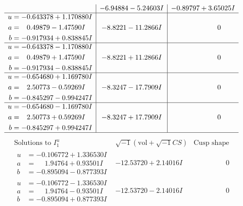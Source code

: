 \documentclass[1p]{elsarticle_modified}
\theoremstyle{definition}
\newcommand{\I}{\sqrt{-1}}
\begin{document}
$$\begin{array}{c|c|c}
 & -6.94884 - 5.24603 I & -0.89797 + 3.65025 I \\ \hline\begin{aligned}
u &= -0.643378 + 1.170880 I \\
a &= \phantom{-}0.49879 - 1.47590 I \\
b &= -0.917934 + 0.838845 I\end{aligned}
 & -8.8221 - 11.2866 I & \phantom{-0.000000 } 0 \\ \hline\begin{aligned}
u &= -0.643378 - 1.170880 I \\
a &= \phantom{-}0.49879 + 1.47590 I \\
b &= -0.917934 - 0.838845 I\end{aligned}
 & -8.8221 + 11.2866 I & \phantom{-0.000000 } 0 \\ \hline\begin{aligned}
u &= -0.654680 + 1.169780 I \\
a &= \phantom{-}2.50773 - 0.59269 I \\
b &= -0.845297 - 0.994247 I\end{aligned}
 & -8.3247 - 17.7909 I & \phantom{-0.000000 } 0 \\ \hline\begin{aligned}
u &= -0.654680 - 1.169780 I \\
a &= \phantom{-}2.50773 + 0.59269 I \\
b &= -0.845297 + 0.994247 I\end{aligned}
 & -8.3247 + 17.7909 I & \phantom{-0.000000 } 0\\
 \hline 
 \end{array}$$\newpage$$\begin{array}{c|c|c}  
\text{Solutions to }I^u_{1}& \I (\text{vol} + \sqrt{-1}CS) & \text{Cusp shape}\\
 \hline 
\begin{aligned}
u &= -0.106772 + 1.336530 I \\
a &= \phantom{-}1.94764 + 0.93501 I \\
b &= -0.895094 - 0.877393 I\end{aligned}
 & -12.53720 + 2.14016 I & \phantom{-0.000000 } 0 \\ \hline\begin{aligned}
u &= -0.106772 - 1.336530 I \\
a &= \phantom{-}1.94764 - 0.93501 I \\
b &= -0.895094 + 0.877393 I\end{aligned}
 & -12.53720 - 2.14016 I & \phantom{-0.000000 } 0 \\ \hline\begin{aligned}

\end{aligned}
\end{array}$$
\end{document}
